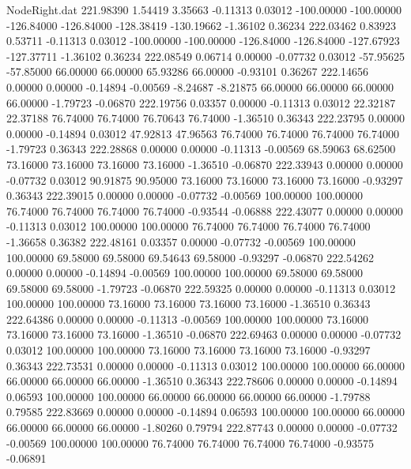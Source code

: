 \begin{filecontents}{NodeRight.dat}
 221.98390    1.54419    3.35663    -0.11313    0.03012 -100.00000 -100.00000 -126.84000 -126.84000 -128.38419 -130.19662   -1.36102    0.36234
 222.03462    0.83923    0.53711    -0.11313    0.03012 -100.00000 -100.00000 -126.84000 -126.84000 -127.67923 -127.37711   -1.36102    0.36234
 222.08549    0.06714    0.00000    -0.07732    0.03012  -57.95625  -57.85000   66.00000   66.00000   65.93286   66.00000   -0.93101    0.36267
 222.14656    0.00000    0.00000    -0.14894   -0.00569   -8.24687   -8.21875   66.00000   66.00000   66.00000   66.00000   -1.79723   -0.06870
 222.19756    0.03357    0.00000    -0.11313    0.03012   22.32187   22.37188   76.74000   76.74000   76.70643   76.74000   -1.36510    0.36343
 222.23795    0.00000    0.00000    -0.14894    0.03012   47.92813   47.96563   76.74000   76.74000   76.74000   76.74000   -1.79723    0.36343
 222.28868    0.00000    0.00000    -0.11313   -0.00569   68.59063   68.62500   73.16000   73.16000   73.16000   73.16000   -1.36510   -0.06870
 222.33943    0.00000    0.00000    -0.07732    0.03012   90.91875   90.95000   73.16000   73.16000   73.16000   73.16000   -0.93297    0.36343
 222.39015    0.00000    0.00000    -0.07732   -0.00569  100.00000  100.00000   76.74000   76.74000   76.74000   76.74000   -0.93544   -0.06888
 222.43077    0.00000    0.00000    -0.11313    0.03012  100.00000  100.00000   76.74000   76.74000   76.74000   76.74000   -1.36658    0.36382
 222.48161    0.03357    0.00000    -0.07732   -0.00569  100.00000  100.00000   69.58000   69.58000   69.54643   69.58000   -0.93297   -0.06870
 222.54262    0.00000    0.00000    -0.14894   -0.00569  100.00000  100.00000   69.58000   69.58000   69.58000   69.58000   -1.79723   -0.06870
 222.59325    0.00000    0.00000    -0.11313    0.03012  100.00000  100.00000   73.16000   73.16000   73.16000   73.16000   -1.36510    0.36343
 222.64386    0.00000    0.00000    -0.11313   -0.00569  100.00000  100.00000   73.16000   73.16000   73.16000   73.16000   -1.36510   -0.06870
 222.69463    0.00000    0.00000    -0.07732    0.03012  100.00000  100.00000   73.16000   73.16000   73.16000   73.16000   -0.93297    0.36343
 222.73531    0.00000    0.00000    -0.11313    0.03012  100.00000  100.00000   66.00000   66.00000   66.00000   66.00000   -1.36510    0.36343
 222.78606    0.00000    0.00000    -0.14894    0.06593  100.00000  100.00000   66.00000   66.00000   66.00000   66.00000   -1.79788    0.79585
 222.83669    0.00000    0.00000    -0.14894    0.06593  100.00000  100.00000   66.00000   66.00000   66.00000   66.00000   -1.80260    0.79794
 222.87743    0.00000    0.00000    -0.07732   -0.00569  100.00000  100.00000   76.74000   76.74000   76.74000   76.74000   -0.93575   -0.06891

\end{filecontents}
